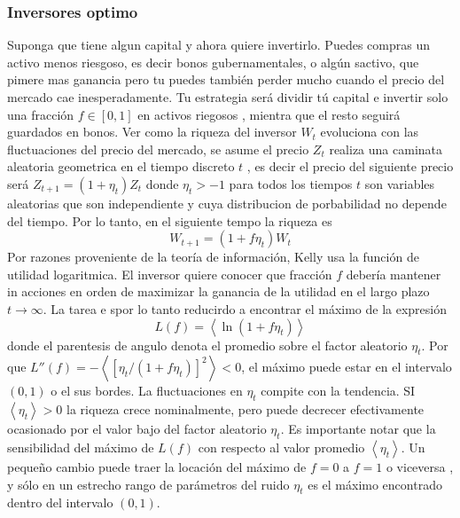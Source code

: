 \documentclass[12pt,a4paper]{article}
\begin{document}
\subsubsection*{Inversores optimo}
\quad Suponga que tiene algun capital y ahora quiere invertirlo. Puedes compras un activo menos riesgoso, es decir bonos gubernamentales, o algún sactivo, que pimere mas ganancia pero tu puedes también perder mucho cuando el precio del mercado cae inesperadamente. Tu estrategia será dividir tú capital e invertir solo una fracción $f\in [0,1]$ en activos riegosos , mientra que el resto seguirá guardados en bonos. Ver como la riqueza del inversor $W_t$ evoluciona con las fluctuaciones del precio del mercado, se asume el precio $Z_t$ realiza una caminata aleatoria geometrica en el tiempo discreto $t$ , es decir el precio del siguiente precio será $Z_{t+1}= (1+\eta_t)Z_t$ donde $\eta_t > -1$ para todos los tiempos $t$ son variables aleatorias que son independiente y cuya distribucion de porbabilidad no depende del tiempo. Por lo tanto, en el siguiente tempo la riqueza es 
\begin{equation}
W_{t+1} = (1+f\eta_t)W_t\label{4,45}
\end{equation}
Por razones proveniente de la teoría de información, Kelly usa la función de utilidad logaritmica. El inversor quiere conocer que fracción $f$ debería mantener in acciones en orden de maximizar la ganancia de la utilidad en el largo plazo $t\rightarrow \infty$. La tarea e spor lo tanto reducirdo a encontrar el máximo de la expresión
\begin{equation}
L(f) = \left< \ln (1+f\eta_t)\right>\label{4.46}
\end{equation}
donde el parentesis de angulo denota el promedio sobre el factor aleatorio $\eta_t$. Por que $L''(f)= -\left< [\eta_t/(1+f\eta_t)]^2\right><0$, el máximo puede estar en el intervalo $(0,1)$ o el sus bordes. La fluctuaciones en $\eta_t$ compite con la tendencia. SI $\left<\eta_t\right>>0$ la riqueza crece nominalmente, pero puede decrecer efectivamente ocasionado por el valor bajo del factor aleatorio $\eta_t$. Es importante notar que la sensibilidad del máximo de $L(f)$ con respecto al valor promedio $\left<\eta_t\right>$. Un pequeño cambio puede traer la locación del máximo de $f=0$ a $f=1$ o viceversa , y sólo en un estrecho rango de parámetros del ruido $\eta_t$ es el máximo encontrado dentro del intervalo $(0,1)$.
\end{document}
